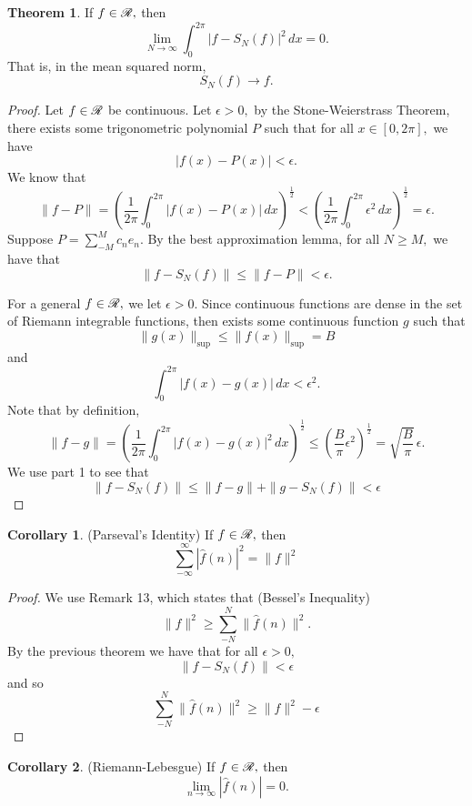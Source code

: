 \documentclass[10pt, oneside]{article}
\theoremstyle{definition}
\newtheorem{thm}{Theorem}
\newtheorem{cor}{Corollary}
\begin{document}
\begin{thm}
    If $f\in \cal R,$  then 
    \[\lim_{N\to \infty}\int_0^{2\pi} |f - S_N(f)|^2\, dx = 0.\] That is, in the mean squared norm, 
    \[S_N(f) \to f.\]
\end{thm}
\begin{proof}
    Let $f\in \cal R$ be continuous. Let $\epsilon>0,$ by the Stone-Weierstrass Theorem, there exists some trigonometric polynomial $P$ such that for all $x\in [0, 2\pi],$ we have
    \[|f(x) - P(x)|< \epsilon.\] We know that 
    \[\|f - P\| = \left(\frac{1}{2\pi}\int_0^{2\pi} |f(x) - P(x)|\, dx\right)^{\frac{1}{2}} < \left(\frac{1}{2\pi}\int_0^{2\pi} \epsilon^2 \, dx\right)^\frac{1}{2}  = \epsilon.\] Suppose $P = \sum_{-M}^M c_ne_n.$ By the best approximation lemma, for all $N\geq M,$ we have that 
    \[\|f - S_N(f)\| \leq \|f - P\|  < \epsilon.\]

    For a general $f\in \cal R,$ we let $\epsilon>0.$ Since continuous functions are dense in the set of Riemann integrable functions, then exists some continuous function $g$ such that 
    \[\|g(x)\|_{\sup} \leq \|f(x)\|_{\sup} = B\] and 
    \[\int_0^{2\pi} |f(x) - g(x)|\, dx  < \epsilon^2.\] Note that by definition,
    \[\|f - g\| = \left(\frac{1}{2\pi}\int_0^{2\pi} |f(x) - g(x)|^2\, dx\right)^\frac{1}{2} \leq  \left(\frac{B}{\pi}\epsilon^2\right)^\frac{1}{2}  = \sqrt{\frac{B}{\pi}}\,\epsilon.\] We use part 1 to see that 
    \[\|f - S_N(f)\| \leq \|f  - g\| + \|g - S_N(f)\| < \epsilon\]
\end{proof}
\begin{cor}
    (Parseval's Identity) If $f\in \cal R,$ then 
    \[\sum_{-\infty}^\infty |\hat{f}(n)|^2 = \|f\|^2\]
\end{cor}
\begin{proof}
    We use Remark 13, which states that (Bessel's Inequality)
    \[\|f\|^2 \geq \sum_{-N}^N \|\hat{f}(n)\|^2.\] By the previous theorem we have that for all $\epsilon>0,$
    \[\|f - S_N(f)\|< \epsilon\] and so 
    \[\sum_{-N}^N \|\hat{f}(n)\|^2 \geq \|f\|^2 - \epsilon\]
\end{proof}
\begin{cor}
    (Riemann-Lebesgue) If $f\in \cal R,$ then 
    \[\lim_{n\to \infty}|\hat{f}(n)|  = 0.\]
\end{cor}

\newpage
\end{document}
